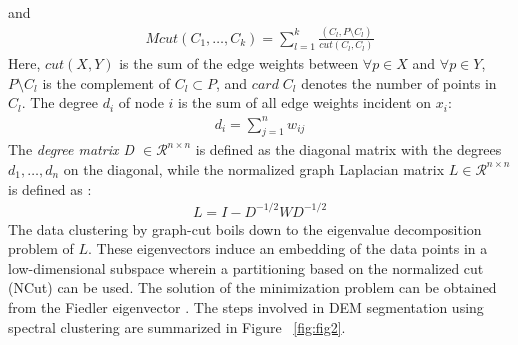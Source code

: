 \documentclass[12pt,letterpaper]{article}
\begin{document}
and
\begin{align}
Mcut (C_1,\dots,C_k) = \sum_{l=1}^k \frac{(C_l, P \setminus C_l)}{cut (C_l,C_l)} 
\end{align}
Here, $cut(X,Y)$ is the sum of the edge weights between $\forall p \in X$ and $\forall p \in Y$, $P\setminus C_l$ is the complement
of $C_l \subset P$, and $card\; C_l$ denotes the number of points in $C_l$.
The degree $d_i$ of node $i$ is the sum of all edge weights incident on $x_i$:
\begin{align}
d_i = \sum_{j=1}^n w_{ij}
\end{align} 
The \textit{degree matrix D $\in \mathcal{R}^{n \times n}$} is defined as the diagonal matrix with the degrees $d_1, \dots, d_n$ on the diagonal, while the normalized graph Laplacian matrix $L \in \mathcal{R}^{n \times n}$ is defined as \citep{Chung1997, ShiMalik2000, Ng2002}:
\begin{align}
L = I - D^{-1/2}WD^{-1/2}
\end{align}
The data clustering by graph-cut boils down to the eigenvalue decomposition problem of $L$.
These eigenvectors induce an embedding of the data points in a low-dimensional subspace wherein a
partitioning based on the normalized cut (NCut) can be used. The solution of the minimization problem can be 
obtained from the Fiedler eigenvector \citep{Stella2003}.
 The steps involved in DEM segmentation using spectral clustering are summarized in Figure ~\ref{fig:fig2}.
\end{document}
